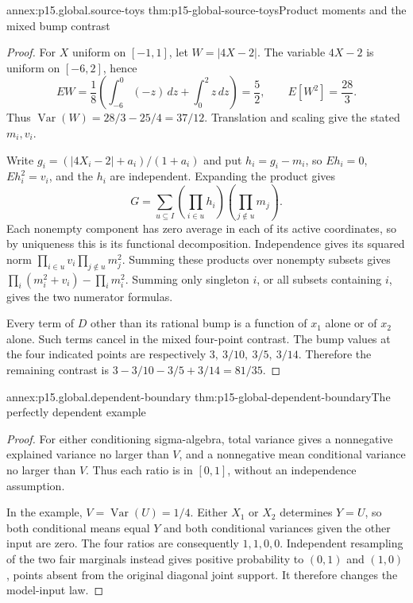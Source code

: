 \begin{annexitem}{annex:p15.global.source-toys}
 {thm:p15-global-source-toys}{Product moments and the mixed bump contrast}
\begin{proof}
For \(X\) uniform on \([-1,1]\), let \(W=|4X-2|\).
The variable \(4X-2\) is uniform on \([-6,2]\), hence
\[
 EW=\frac18\left(\int_{-6}^0(-z)\,dz+\int_0^2z\,dz\right)=\frac52,
 \qquad E[W^2]=\frac{28}{3}.
\]
Thus \(\operatorname{Var}(W)=28/3-25/4=37/12\).
Translation and scaling give the stated \(m_i,v_i\).

Write \(g_i=(|4X_i-2|+a_i)/(1+a_i)\) and put \(h_i=g_i-m_i\),
so \(Eh_i=0\), \(Eh_i^2=v_i\), and the
\(h_i\) are independent. Expanding the product gives
\[
 G=\sum_{u\subseteq I}
       \left(\prod_{i\in u}h_i\right)
       \left(\prod_{j\notin u}m_j\right).
\]
Each nonempty component has zero average in each of its active
coordinates, so by uniqueness this is its functional decomposition.
Independence gives its squared norm
\(\prod_{i\in u}v_i\prod_{j\notin u}m_j^2\).
Summing these products over nonempty subsets gives
\(\prod_i(m_i^2+v_i)-\prod_i m_i^2\).
Summing only singleton \(i\), or all subsets containing \(i\),
gives the two numerator formulas.

Every term of \(D\) other than its rational bump is a function of
\(x_1\) alone or of \(x_2\) alone. Such terms cancel in the mixed
four-point contrast. The bump values at the four indicated points are
respectively \(3,\ 3/10,\ 3/5,\ 3/14\).
Therefore the remaining contrast is
\(3-3/10-3/5+3/14=81/35\).
\end{proof}
\end{annexitem}

\begin{annexitem}{annex:p15.global.dependent-boundary}
 {thm:p15-global-dependent-boundary}{The perfectly dependent example}
\begin{proof}
For either conditioning sigma-algebra, total variance gives a
nonnegative explained variance no larger than \(V\), and a nonnegative
mean conditional variance no larger than \(V\). Thus each ratio is
in \([0,1]\), without an independence assumption.

In the example, \(V=\operatorname{Var}(U)=1/4\).
Either \(X_1\) or \(X_2\) determines \(Y=U\), so both conditional
means equal \(Y\) and both conditional variances given the other input
are zero. The four ratios are consequently \(1,1,0,0\).
Independent resampling of the two fair marginals instead gives positive
probability to \((0,1)\) and \((1,0)\), points absent from the original
diagonal joint support. It therefore changes the model-input law.
\end{proof}
\end{annexitem}

